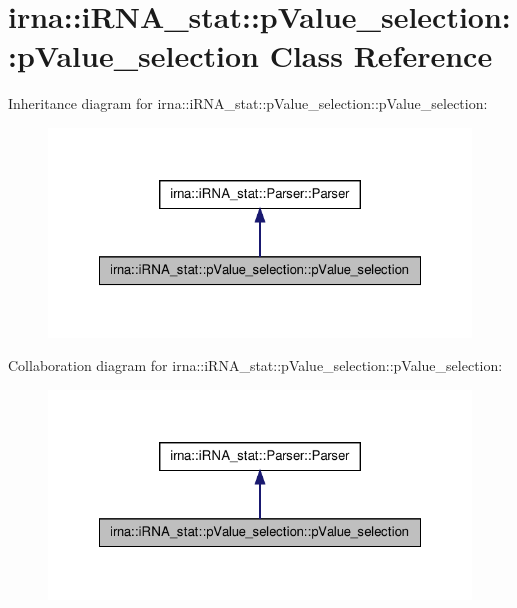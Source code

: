\hypertarget{classirna_1_1iRNA__stat_1_1pValue__selection_1_1pValue__selection}{
\section{irna\-:\-:i\-R\-N\-A\-\_\-stat\-:\-:p\-Value\-\_\-selection\-:\-:p\-Value\-\_\-selection \-Class \-Reference}
\label{classirna_1_1iRNA__stat_1_1pValue__selection_1_1pValue__selection}
}


\-Inheritance diagram for irna\-:\-:i\-R\-N\-A\-\_\-stat\-:\-:p\-Value\-\_\-selection\-:\-:p\-Value\-\_\-selection\-:\nopagebreak
\begin{figure}[H]
\begin{center}
\leavevmode
\includegraphics[width=324pt]{classirna_1_1iRNA__stat_1_1pValue__selection_1_1pValue__selection__inherit__graph}
\end{center}
\end{figure}


\-Collaboration diagram for irna\-:\-:i\-R\-N\-A\-\_\-stat\-:\-:p\-Value\-\_\-selection\-:\-:p\-Value\-\_\-selection\-:\nopagebreak
\begin{figure}[H]
\begin{center}
\leavevmode
\includegraphics[width=324pt]{classirna_1_1iRNA__stat_1_1pValue__selection_1_1pValue__selection__coll__graph}
\end{center}
\end{figure}
